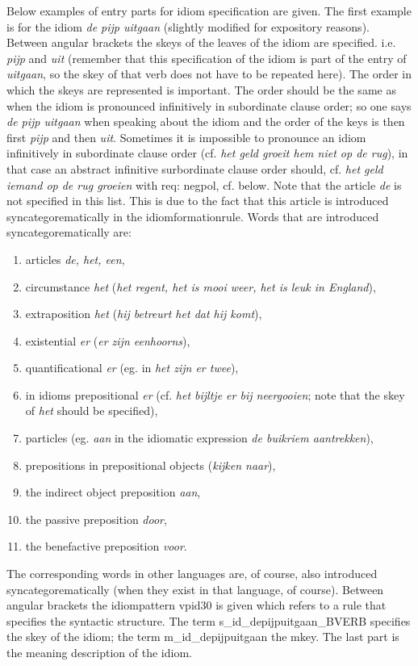 Below examples of entry parts for idiom specification are given. The first
example is for the idiom {\em de pijp uitgaan} (slightly modified for
expository reasons). Between angular brackets the skeys of the leaves of the
idiom are specified. i.e. {\em pijp} and {\em uit} (remember that this
specification of the idiom is part of the entry of {\em uitgaan}, so the skey
of that verb does not have to be repeated here). The order in which the skeys
are represented is important. The order should be the same as when the idiom is
pronounced infinitively in subordinate clause order; so one says {\em de pijp
uitgaan} when speaking about the idiom and the order of the keys is then first
{\em pijp} and then {\em uit}. Sometimes it is impossible to pronounce an idiom
infinitively in subordinate clause order (cf. {\em het geld groeit hem niet op
de rug}), in that case an abstract infinitive surbordinate clause order should,
cf. {\em het geld iemand op de rug groeien} with req: negpol, cf. below. Note
that the article {\em de} is not specified in this list. This is due to the
fact that this article is introduced syncategorematically in the
idiomformationrule. 
Words that are introduced syncategorematically are:
\begin{enumerate}
  \item  articles {\em de, het, een}, 
  \item  circumstance {\em het} ({\em het regent, het is mooi weer, het is leuk
in England}), 
  \item extraposition {\em het} ({\em hij betreurt het dat hij komt}), 
  \item existential {\em er} ({\em er zijn eenhoorns}), 
  \item quantificational {\em er} (eg. in {\em het zijn er twee}), 
  \item in idioms prepositional {\em er} (cf. {\em het bijltje er bij
neergooien}; note that the skey of {\em het} should be specified), 
  \item particles (eg. {\em aan} in the idiomatic expression {\em de buikriem
aantrekken}), 
  \item prepositions in prepositional objects ({\em kijken naar}), 
  \item the indirect object preposition {\em aan}, 
  \item the passive preposition {\em door}, 
  \item the benefactive preposition {\em voor}. 
\end{enumerate}

The corresponding words in other languages are, of course, also introduced
syncategorematically (when they exist in that language, of course). Between
angular brackets the idiompattern vpid30 is given which refers to a rule that
specifies the syntactic structure. The term s\_id\_depijpuitgaan\_BVERB
specifies the skey of the idiom; the term m\_id\_depijpuitgaan the mkey. The
last part is the meaning description of the idiom. 

